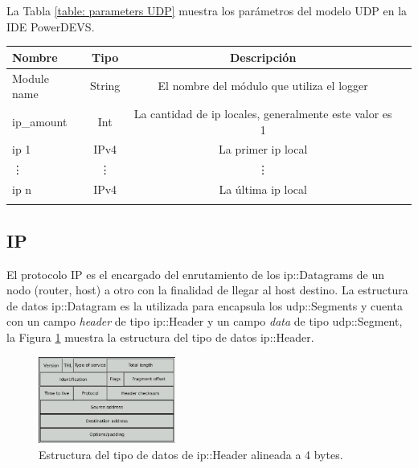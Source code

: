 \documentclass[10pt,a4paper]{article}
\begin{document}
La Tabla \ref{table: parameters UDP} muestra los parámetros del modelo UDP en la IDE PowerDEVS.

\begin{tabular}{|l|c|c|c|}
  \hline
  Nombre & Tipo & Descripción \\
  \hline
  Module name & String & El nombre del módulo que utiliza el logger \\
  \hline
  ip_amount & Int & La cantidad de ip locales, generalmente este valor es 1 \\
  \hline
  ip 1 & IPv4 & La primer ip local \\
  \hline
  \vdots & \vdots & \vdots \\
  \hline
  ip n & IPv4 & La última ip local \\
  \hline
  \label{table: parameters UDP}
  \caption{Parametros del modelo UDP}
\end{tabular}


\subsection{IP}

El protocolo IP es el encargado del enrutamiento de los ip::Datagrams de un nodo (router, host) a otro con la finalidad de llegar al host destino. La estructura de datos ip::Datagram es la utilizada para encapsula los udp::Segments y cuenta con un campo \textit{header} de tipo ip::Header y un campo \textit{data} de tipo udp::Segment, la Figura \ref{figure: ip header} muestra la estructura del tipo de datos ip::Header.  \\

\begin{figure}[!htb]
    \centering
    \includegraphics[width = 0.4\textwidth]{img/png/IP-datagram.png}
    \caption{Estructura del tipo de datos de ip::Header alineada a 4 bytes.}
    \label{figure: ip header}
\end{figure}
\end{document}
